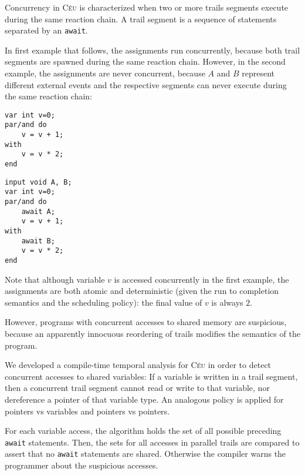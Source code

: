 \documentclass[10pt]{sensys-proc}
\newcommand{\CEU}{\textsc{C\'{e}u}\xspace}
\newcommand{\code}[1] {{\small{\texttt{#1}}}}
\begin{document}
Concurrency in \CEU is characterized when two or more trails segments execute 
during the same reaction chain.
A trail segment is a sequence of statements separated by an \code{await}.

In first example that follows, the assignments run concurrently, because both 
trail segments are spawned during the same reaction chain.
However, in the second example, the assignments are never concurrent, because 
$A$ and $B$ represent different external events and the respective segments can 
never execute during the same reaction chain:

\begin{minipage}[t]{0.40\linewidth}
{\small
\begin{verbatim}
var int v=0;
par/and do
    v = v + 1;
with
    v = v * 2;
end
\end{verbatim}
}
\end{minipage}
\hspace{0cm}
\begin{minipage}[t]{0.40\linewidth}
{\small
\begin{verbatim}
input void A, B;
var int v=0;
par/and do
    await A;
    v = v + 1;
with
    await B;
    v = v * 2;
end

\end{verbatim}
}
\end{minipage}

Note that although variable $v$ is accessed concurrently in the first example, 
the assignments are both atomic and deterministic (given the run to completion 
semantics and the scheduling policy): the final value of $v$ is always $2$.

However, programs with concurrent accesses to shared memory are suspicious, 
because an apparently innocuous reordering of trails modifies the semantics of 
the program.


We developed a compile-time temporal analysis for \CEU in order to detect 
concurrent accesses to shared variables:
If a variable is written in a trail segment, then a concurrent trail segment 
cannot read or write to that variable, nor dereference a pointer of that 
variable type.
An analogous policy is applied for pointers vs variables and pointers vs 
pointers.

For each variable access, the algorithm holds the set of all possible preceding 
\code{await} statements.
Then, the sets for all accesses in parallel trails are compared to assert that 
no \code{await} statements are shared.
Otherwise the compiler warns the programmer about the suspicious accesses.
\end{document}

